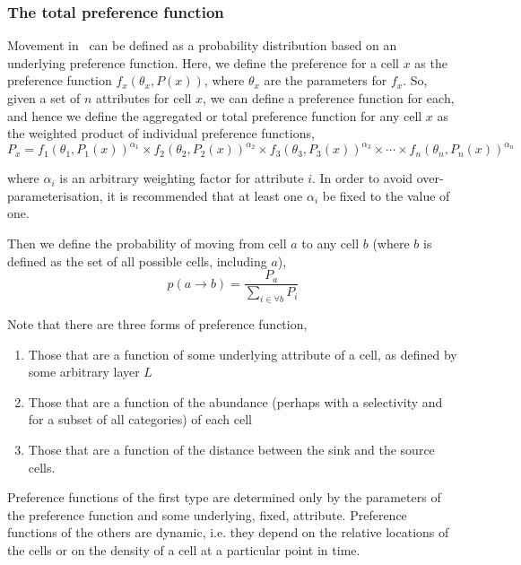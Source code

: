 \subsubsection*{The total preference function}

Movement in \SPM\ can be defined as a probability distribution based on an underlying preference function. Here, we define the preference for a cell $x$ as the preference function $f_x(\theta_x,P(x))$, where $\theta_x$ are the parameters for $f_x$. So, given a set of $n$ attributes for cell $x$, we can define a preference function for each, and hence we define the aggregated or total preference function for any cell $x$ as the weighted product of individual preference functions,
\begin{equation}
  P_x=f_1(\theta_1,P_1(x))^{\alpha_1} \times f_2(\theta_2,P_2(x))^{\alpha_2} \times f_3(\theta_3,P_3(x))^{\alpha_3} \times \cdots \times f_n(\theta_n,P_n(x))^{\alpha_n}
\end{equation}

where $\alpha_i$ is an arbitrary weighting factor for attribute $i$. In order to avoid over-parameterisation, it is recommended that at least one $\alpha_i$ be fixed to the value of one.

Then we define the probability of moving from cell $a$ to any cell $b$ (where $b$ is defined as the set of all possible cells, including $a$),
\begin{equation}
  p(a\rightarrow b) = \frac{P_a}{\sum\limits_{i \in \forall b} P_i}
\end{equation}

Note that there are three forms of preference function,
\begin{enumerate}
\item Those that are a function of some underlying attribute of a cell, as defined by some arbitrary layer $L$
\item Those that are a function of the abundance (perhaps with a selectivity and for a subset of all categories) of each cell
\item Those that are a function of the distance between the sink and the source cells. 
\end{enumerate} 

Preference functions of the first type are determined only by the parameters of the preference function and some underlying, fixed, attribute. Preference functions of the others are dynamic, i.e. they depend on the relative locations of the cells or on the density of a cell at a particular point in time.


